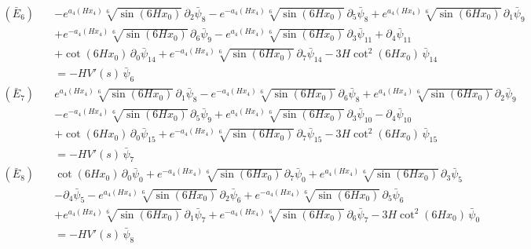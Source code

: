 \begin{align*}
(\bar E_{6})\quad & -e^{a_4\left(H x_4\right)} \sqrt[6]{\sin \left(6 H x_0\right)}\,\partial_{2}\bar\psi_{8} - e^{-a_4\left(H x_4\right)} \sqrt[6]{\sin \left(6 H x_0\right)}\,\partial_{5}\bar\psi_{8} + e^{a_4\left(H x_4\right)} \sqrt[6]{\sin \left(6 H x_0\right)}\,\partial_{1}\bar\psi_{9} \\
 &  + e^{-a_4\left(H x_4\right)} \sqrt[6]{\sin \left(6 H x_0\right)}\,\partial_{6}\bar\psi_{9} - e^{a_4\left(H x_4\right)} \sqrt[6]{\sin \left(6 H x_0\right)}\,\partial_{3}\bar\psi_{11} + \partial_{4}\bar\psi_{11} \\
 &  + \cot \left(6 H x_0\right)\,\partial_{0}\bar\psi_{14} + e^{-a_4\left(H x_4\right)} \sqrt[6]{\sin \left(6 H x_0\right)}\,\partial_{7}\bar\psi_{14} - 3 H \cot ^2\left(6 H x_0\right)\,\bar\psi_{14} \\
 & = -H V'(s)\,\bar\psi_{6}
\end{align*}
\begin{align*}
(\bar E_{7})\quad & e^{a_4\left(H x_4\right)} \sqrt[6]{\sin \left(6 H x_0\right)}\,\partial_{1}\bar\psi_{8} - e^{-a_4\left(H x_4\right)} \sqrt[6]{\sin \left(6 H x_0\right)}\,\partial_{6}\bar\psi_{8} + e^{a_4\left(H x_4\right)} \sqrt[6]{\sin \left(6 H x_0\right)}\,\partial_{2}\bar\psi_{9} \\
 &  - e^{-a_4\left(H x_4\right)} \sqrt[6]{\sin \left(6 H x_0\right)}\,\partial_{5}\bar\psi_{9} + e^{a_4\left(H x_4\right)} \sqrt[6]{\sin \left(6 H x_0\right)}\,\partial_{3}\bar\psi_{10} - \partial_{4}\bar\psi_{10} \\
 &  + \cot \left(6 H x_0\right)\,\partial_{0}\bar\psi_{15} + e^{-a_4\left(H x_4\right)} \sqrt[6]{\sin \left(6 H x_0\right)}\,\partial_{7}\bar\psi_{15} - 3 H \cot ^2\left(6 H x_0\right)\,\bar\psi_{15} \\
 & = -H V'(s)\,\bar\psi_{7}
\end{align*}
\begin{align*}
(\bar E_{8})\quad & \cot \left(6 H x_0\right)\,\partial_{0}\bar\psi_{0} + e^{-a_4\left(H x_4\right)} \sqrt[6]{\sin \left(6 H x_0\right)}\,\partial_{7}\bar\psi_{0} + e^{a_4\left(H x_4\right)} \sqrt[6]{\sin \left(6 H x_0\right)}\,\partial_{3}\bar\psi_{5} \\
 &  - \partial_{4}\bar\psi_{5} - e^{a_4\left(H x_4\right)} \sqrt[6]{\sin \left(6 H x_0\right)}\,\partial_{2}\bar\psi_{6} + e^{-a_4\left(H x_4\right)} \sqrt[6]{\sin \left(6 H x_0\right)}\,\partial_{5}\bar\psi_{6} \\
 &  + e^{a_4\left(H x_4\right)} \sqrt[6]{\sin \left(6 H x_0\right)}\,\partial_{1}\bar\psi_{7} + e^{-a_4\left(H x_4\right)} \sqrt[6]{\sin \left(6 H x_0\right)}\,\partial_{6}\bar\psi_{7} - 3 H \cot ^2\left(6 H x_0\right)\,\bar\psi_{0} \\
 & = -H V'(s)\,\bar\psi_{8}
\end{align*}
